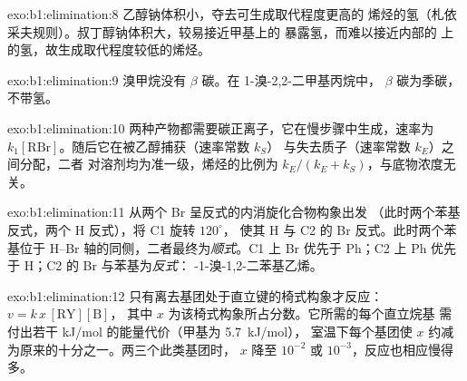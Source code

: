 \begin{solution}{exo:b1:elimination:8}
乙醇钠体积小，夺去可生成取代程度更高的
烯烃的氢（札依采夫规则）。叔丁醇钠体积大，较易接近甲基上的
暴露氢，而难以接近内部的
上的氢，故生成取代程度较低的烯烃。
\end{solution}

\begin{solution}{exo:b1:elimination:9}
溴甲烷没有 $\beta$ 碳。在 1-溴-2,2-二甲基丙烷中，
$\beta$ 碳为季碳，不带氢。
\end{solution}

\begin{solution}{exo:b1:elimination:10}
两种产物都需要碳正离子，它在慢步骤中生成，速率为
$k_1[\mathrm{RBr}]$。随后它在被乙醇捕获（速率常数 $k_S$）
与失去质子（速率常数 $k_E$）之间分配，二者
对溶剂均为准一级，烯烃的比例为
$k_E/(k_E + k_S)$，与底物浓度无关。
\end{solution}

\begin{solution}{exo:b1:elimination:11}
从两个 Br 呈反式的内消旋化合物构象出发
（此时两个苯基反式，两个 H 反式），将 C1 旋转 $120^\circ$，
使其 H 与 C2 的 Br 反式。此时两个苯基位于
H--Br 轴的同侧，二者最终为\textit{顺式}。C1 上 Br 优先于
Ph；C2 上 Ph 优先于 H；C2 的 Br 与苯基为\textit{反式}：
-1-溴-1,2-二苯基乙烯。
\end{solution}

\begin{solution}{exo:b1:elimination:12}
只有离去基团处于直立键的椅式构象才反应：$v = k\,x\,[\mathrm{RY}][\mathrm{B}]$，
其中 $x$ 为该椅式构象所占分数。它所需的每个直立烷基
需付出若干 kJ/mol 的能量代价（甲基为 \qty{5.7}{kJ/mol}），
室温下每个基团使 $x$ 约减为原来的十分之一。两三个此类基团时，
$x$ 降至 $10^{-2}$ 或 $10^{-3}$，反应也相应慢得多。
\end{solution}

